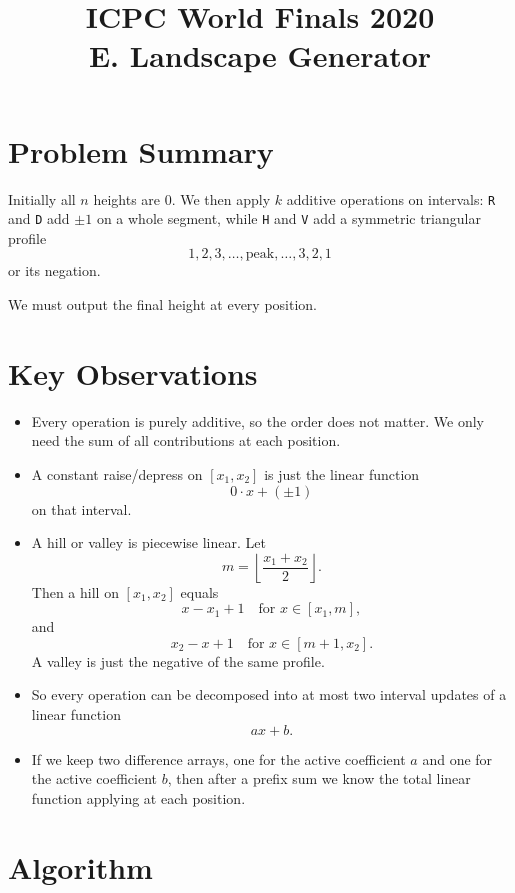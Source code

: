 \documentclass[11pt]{article}
\title{ICPC World Finals 2020\\E. Landscape Generator}
\author{}
\date{}
\begin{document}
\maketitle

\section*{Problem Summary}

Initially all $n$ heights are $0$.
We then apply $k$ additive operations on intervals:
\texttt{R} and \texttt{D} add $\pm 1$ on a whole segment,
while \texttt{H} and \texttt{V} add a symmetric triangular profile
\[
    1,2,3,\dots,\text{peak},\dots,3,2,1
\]
or its negation.

We must output the final height at every position.

\section*{Key Observations}

\begin{itemize}[leftmargin=*]
    \item Every operation is purely additive, so the order does not matter. We only need the sum of all
    contributions at each position.
    \item A constant raise/depress on $[x_1, x_2]$ is just the linear function
    \[
        0 \cdot x + (\pm 1)
    \]
    on that interval.
    \item A hill or valley is piecewise linear. Let
    \[
        m = \left\lfloor \frac{x_1 + x_2}{2} \right\rfloor.
    \]
    Then a hill on $[x_1, x_2]$ equals
    \[
        x - x_1 + 1 \quad \text{for } x \in [x_1, m],
    \]
    and
    \[
        x_2 - x + 1 \quad \text{for } x \in [m+1, x_2].
    \]
    A valley is just the negative of the same profile.
    \item So every operation can be decomposed into at most two interval updates of a linear function
    \[
        a x + b.
    \]
    \item If we keep two difference arrays, one for the active coefficient $a$ and one for the active
    coefficient $b$, then after a prefix sum we know the total linear function applying at each position.
\end{itemize}

\section*{Algorithm}
\end{document}
